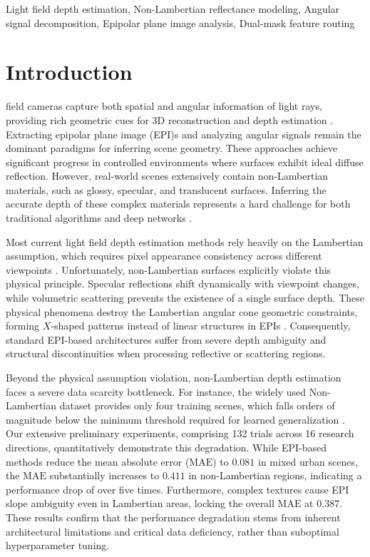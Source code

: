 \documentclass[lettersize,journal]{IEEEtran}
\begin{document}
\begin{IEEEkeywords}
Light field depth estimation, Non-Lambertian reflectance modeling, Angular signal decomposition, Epipolar plane image analysis, Dual-mask feature routing
\end{IEEEkeywords}

\section{Introduction}

 field cameras capture both spatial and angular information of light rays, providing rich geometric cues for 3D reconstruction and depth estimation \cite{lightlight}. Extracting epipolar plane image (EPI)s and analyzing angular signals remain the dominant paradigms for inferring scene geometry. These approaches achieve significant progress in controlled environments where surfaces exhibit ideal diffuse reflection. However, real-world scenes extensively contain non-Lambertian materials, such as glossy, specular, and translucent surfaces. Inferring the accurate depth of these complex materials represents a hard challenge for both traditional algorithms and deep networks \cite{nonnon_22}.

Most current light field depth estimation methods rely heavily on the Lambertian assumption, which requires pixel appearance consistency across different viewpoints \cite{photophoto}. Unfortunately, non-Lambertian surfaces explicitly violate this physical principle. Specular reflections shift dynamically with viewpoint changes, while volumetric scattering prevents the existence of a single surface depth. These physical phenomena destroy the Lambertian angular cone geometric constraints, forming $X$-shaped patterns instead of linear structures in EPIs \cite{epipolarepipo}. Consequently, standard EPI-based architectures suffer from severe depth ambiguity and structural discontinuities when processing reflective or scattering regions.

Beyond the physical assumption violation, non-Lambertian depth estimation faces a severe data scarcity bottleneck. For instance, the widely used Non-Lambertian dataset provides only four training scenes, which falls orders of magnitude below the minimum threshold required for learned generalization \cite{nonnon}. Our extensive preliminary experiments, comprising 132 trials across 16 research directions, quantitatively demonstrate this degradation. While EPI-based methods reduce the mean absolute error ($\text{MAE}$) to $0.081$ in mixed urban scenes, the $\text{MAE}$ substantially increases to $0.411$ in non-Lambertian regions, indicating a performance drop of over five times. Furthermore, complex textures cause EPI slope ambiguity even in Lambertian areas, locking the overall $\text{MAE}$ at $0.387$. These results confirm that the performance degradation stems from inherent architectural limitations and critical data deficiency, rather than suboptimal hyperparameter tuning.
\end{document}
